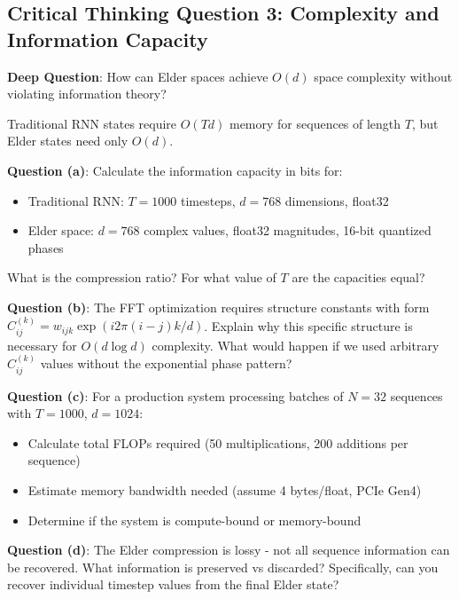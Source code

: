 \documentclass[12pt,a4paper]{article}
\theoremstyle{definition}
\theoremstyle{remark}
\begin{document}
\newpage
\subsection{Critical Thinking Question 3: Complexity and Information Capacity}

\begin{tcolorbox}[colback=blue!5,colframe=blue!70!black,title=Critical Thinking Question 3,fonttitle=\bfseries]
\textbf{Deep Question}: How can Elder spaces achieve $O(d)$ space complexity without violating information theory?

Traditional RNN states require $O(Td)$ memory for sequences of length $T$, but Elder states need only $O(d)$.

\textbf{Question (a)}: Calculate the information capacity in bits for:
\begin{itemize}
\item Traditional RNN: $T=1000$ timesteps, $d=768$ dimensions, float32
\item Elder space: $d=768$ complex values, float32 magnitudes, 16-bit quantized phases
\end{itemize}

What is the compression ratio? For what value of $T$ are the capacities equal?

\textbf{Question (b)}: The FFT optimization requires structure constants with form $C_{ij}^{(k)} = w_{ijk} \exp(i2\pi(i-j)k/d)$. Explain why this specific structure is necessary for $O(d \log d)$ complexity. What would happen if we used arbitrary $C_{ij}^{(k)}$ values without the exponential phase pattern?

\textbf{Question (c)}: For a production system processing batches of $N=32$ sequences with $T=1000$, $d=1024$:
\begin{itemize}
\item Calculate total FLOPs required (50 multiplications, 200 additions per sequence)
\item Estimate memory bandwidth needed (assume 4 bytes/float, PCIe Gen4)
\item Determine if the system is compute-bound or memory-bound
\end{itemize}

\textbf{Question (d)}: The Elder compression is lossy - not all sequence information can be recovered. What information is preserved vs discarded? Specifically, can you recover individual timestep values from the final Elder state?
\end{tcolorbox}
\end{document}
